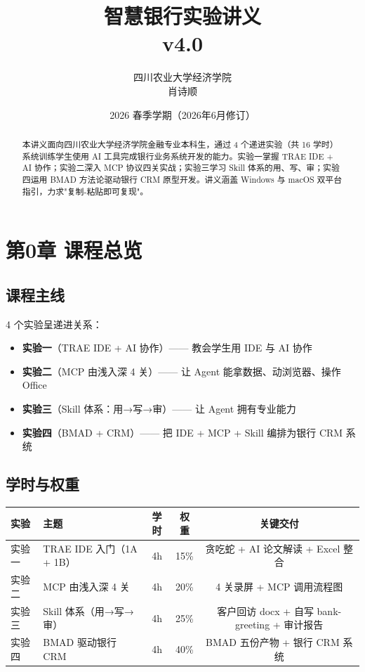 \documentclass[12pt,a4paper]{ctexart}
\title{
  \vspace{-2cm}
  {\LARGE\bfseries 智慧银行实验讲义} \\[0.5em]
  {\large v4.0}
}
\author{
  四川农业大学经济学院 \\
  肖诗顺
}
\date{2026 春季学期\quad（2026年6月修订）}
\begin{document}
\maketitle

\begin{abstract}
本讲义面向四川农业大学经济学院金融专业本科生，通过 4 个递进实验（共 16 学时）系统训练学生使用 AI 工具完成银行业务系统开发的能力。实验一掌握 TRAE IDE + AI 协作；实验二深入 MCP 协议四关实战；实验三学习 Skill 体系的用、写、审；实验四运用 BMAD 方法论驱动银行 CRM 原型开发。讲义涵盖 Windows 与 macOS 双平台指引，力求"复制-粘贴即可复现"。
\end{abstract}

\tableofcontents
\clearpage

\section{第0章 课程总览}

\subsection{课程主线}

4 个实验呈递进关系：

\begin{itemize}[leftmargin=2em]
  \item \textbf{实验一}（TRAE IDE + AI 协作）—— 教会学生用 IDE 与 AI 协作
  \item \textbf{实验二}（MCP 由浅入深 4 关）—— 让 Agent 能拿数据、动浏览器、操作 Office
  \item \textbf{实验三}（Skill 体系：用→写→审）—— 让 Agent 拥有专业能力
  \item \textbf{实验四}（BMAD + CRM）—— 把 IDE + MCP + Skill 编排为银行 CRM 系统
\end{itemize}

\subsection{学时与权重}

\begin{table}[H]
\centering
\begin{tabular}{llccc}
\toprule
\textbf{实验} & \textbf{主题} & \textbf{学时} & \textbf{权重} & \textbf{关键交付} \\
\midrule
实验一 & TRAE IDE 入门（1A + 1B） & 4h & 15\% & 贪吃蛇 + AI 论文解读 + Excel 整合 \\
实验二 & MCP 由浅入深 4 关 & 4h & 20\% & 4 关录屏 + MCP 调用流程图 \\
实验三 & Skill 体系（用→写→审） & 4h & 25\% & 客户回访 docx + 自写 bank-greeting + 审计报告 \\
实验四 & BMAD 驱动银行 CRM & 4h & 40\% & BMAD 五份产物 + 银行 CRM 系统 \\
\bottomrule
\end{tabular}
\end{table}
\end{document}
